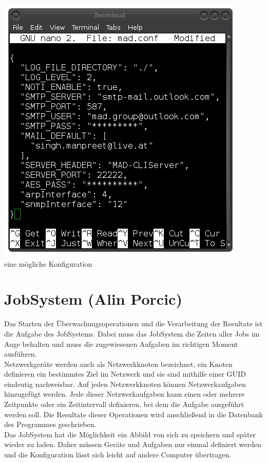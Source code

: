\documentclass[12pt,a4paper]{report}
\begin{document}
\begin{onehalfspace}
\begin{center}
\includegraphics[scale=0.6]{img/madconf.png}\\
eine mögliche Konfiguration
\end{center}

\chapter{JobSystem (Alin Porcic)}

Das Starten der Überwachungsoperationen und die Verarbeitung der Resultate ist die Aufgabe des JobSystems. Dabei muss das JobSystem die Zeiten aller Jobs im Auge behalten und muss die zugewiesenen Aufgaben im richtigen Moment ausführen.\\
Netzwerkgeräte werden auch als Netzwerkknoten bezeichnet, ein Knoten definieren ein bestimmtes Ziel im Netzwerk und sie sind mithilfe einer GUID eindeutig nachweisbar. Auf jeden Netzwerkknoten können Netzwerkaufgaben hinzugefügt werden. Jede dieser Netzwerkaufgaben kann einen oder mehrere Zeitpunkte oder ein Zeitintervall definieren, bei dem die Aufgabe ausgeführt werden soll. Die Resultate dieser Operationen wird anschließend in die Datenbank des Programmes geschrieben.\\
Das JobSystem hat die Möglichkeit ein Abbild von sich zu speichern und später wieder zu laden. Daher müssen Geräte und Aufgaben nur einmal definiert werden und die Konfiguration lässt sich leicht auf andere Computer übertragen.\\


\end{onehalfspace}
\end{document}

